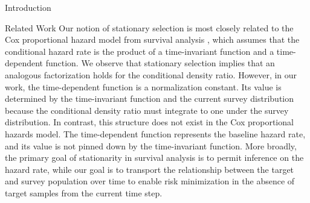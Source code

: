 \documentclass{article}
\theoremstyle{definition}
\theoremstyle{plain}
\theoremstyle{remark}
\begin{document}
\begin{section}{Introduction}
\begin{subsection}{Related Work}
Our notion of stationary selection is most closely related to the Cox proportional hazard model from survival analysis \citep{cox1972regression}, which assumes that the conditional hazard rate is the product of a time-invariant function and a time-dependent function. We observe that stationary selection implies that an analogous factorization holds for the conditional density ratio. However, in our work, the time-dependent function is a normalization constant. Its value is determined by the time-invariant function and the current survey distribution because the conditional density ratio must integrate to one under the survey distribution. In contrast, this structure does not exist in the Cox proportional hazards model. The time-dependent function represents the baseline hazard rate, and its value is not pinned down by the time-invariant function. More broadly, the primary goal of stationarity in survival analysis is to permit inference on the hazard rate, while our goal is to transport the relationship between the target and survey population over time to enable risk minimization in the absence of target samples from the current time step.



  
  

  
  
  

\end{subsection}
\end{section}
\end{document}

